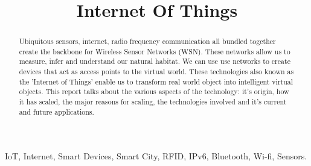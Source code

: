 \documentclass[conference]{IEEEtran}
\begin{document}
%
\title{Internet Of Things}


\author{\IEEEauthorblockN{}
\IEEEauthorblockA{}
\and
{}
\and
\IEEEauthorblockN{}
\IEEEauthorblockA{}
}


\maketitle


\begin{abstract}
Ubiquitous sensors, internet, radio frequency communication all bundled together create the backbone for Wireless Sensor Networks (WSN). These networks allow us to measure, infer and understand our natural habitat. We can use use networks to create devices that act as access points to the virtual world. These technologies also known as the 'Internet of Things' enable us to transform real world object into intelligent virtual objects.\newline
This report talks about the various aspects of the technology: it's origin, how it has scaled, the major reasons for scaling, the technologies involved and it's current and future applications.
\end{abstract}

\begin{IEEEkeywords}
IoT, Internet, Smart Devices, Smart City, RFID, IPv6, Bluetooth, Wi-fi, Sensors.
\end{IEEEkeywords}


%
\IEEEpeerreviewmaketitle
\end{document}
